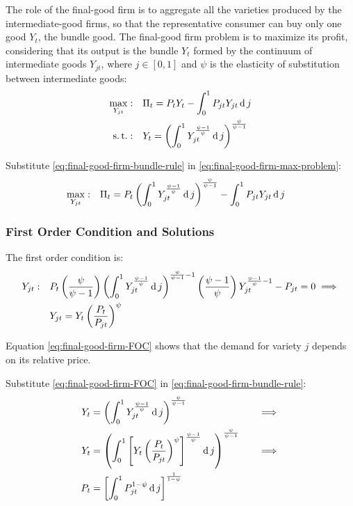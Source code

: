 \documentclass[
thesis.tex
]{subfiles}
\begin{document}
	The role of the final-good firm is to aggregate all the varieties produced by the intermediate-good firms, so that the representative consumer can buy only one good $Y_t$, the bundle good. The final-good firm problem is to maximize its profit, considering that its output is the bundle $Y_t$ formed by the continuum of intermediate goods $Y_{jt}$, where $j \in [0,1]$ and $\psi$ is the elasticity of substitution between intermediate goods:
	\begin{align}
		\label{eq:final-good-firm-max-problem}
		\max_{Y_{jt}}: &\quad \Pi_t = P_t Y_t - \int_{0}^{1} P_{jt} Y_{jt} \operatorname{d} j\\
		\label{eq:final-good-firm-bundle-rule}
		\operatorname{s.t.}: & \quad Y_t = \left( \int_{0}^{1} Y_{jt}^{\frac{\psi-1}{\psi}} \operatorname{d} j \right)^{\frac{\psi}{\psi-1}}
	\end{align}
	
	Substitute \ref{eq:final-good-firm-bundle-rule} in \ref{eq:final-good-firm-max-problem}:
	\begin{align}
		\label{eq:final-good-firm-max-problem-2}
		\max_{Y_{jt}}: & \quad \Pi_t = P_t \left( \int_{0}^{1} Y_{jt}^{\frac{\psi-1}{\psi}} \operatorname{d} j \right)^{\frac{\psi}{\psi-1}} - \int_{0}^{1} P_{jt} Y_{jt} \operatorname{d} j
	\end{align}
	
	\subsubsection*{First Order Condition and Solutions}
	
	The first order condition is:
	\begin{align}
		Y_{jt}:\quad & P_t \left( \frac{\psi}{\psi-1} \right) \left( \int_{0}^{1} Y_{jt}^{\frac{\psi-1}{\psi}} \operatorname{d} j \right)^{\frac{\psi}{\psi-1}-1} \left( \frac{\psi-1}{\psi} \right) Y_{jt}^{\frac{\psi-1}{\psi}-1} - P_{jt} = 0 \implies \nonumber \\
		\label{eq:final-good-firm-FOC}
		& Y_{jt} = Y_t \left( \frac{P_t}{P_{jt}} \right)^{\psi}
	\end{align}
	
	Equation \ref{eq:final-good-firm-FOC} shows that the demand for variety $j$ depends on its relative price. 
	
	Substitute \ref{eq:final-good-firm-FOC} in \ref{eq:final-good-firm-bundle-rule}:
	\begin{alignat}{2}
		Y_t & = \left( \int_{0}^{1} Y_{jt}^{\frac{\psi-1}{\psi}} \operatorname{d} j \right)^{\frac{\psi}{\psi-1}} &\implies \nonumber \\
		Y_t & = \left( \int_{0}^{1} \left[ Y_t \left( \frac{P_t}{P_{jt}} \right)^{\psi} \right]^{\frac{\psi-1}{\psi}} \operatorname{d} j \right)^{\frac{\psi}{\psi-1}} \quad &\implies \nonumber \\
		P_t & = \left[ \int_{0}^{1} P_{jt}^{1-\psi} \operatorname{d} j \right]^{\frac{1}{1-\psi}} \label{eq:final-good-firm-markup}
	\end{alignat}
	
\end{document}
